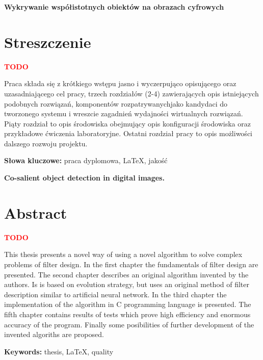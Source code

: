 \newpage
\begin{center}
\large \bf
Wykrywanie współistotnych obiektów na obrazach cyfrowych
\end{center}

\section*{Streszczenie}
\textcolor{red}{\textbf{TODO}}

Praca składa się z krótkiego wstępu jasno i
wyczerpująco opisującego oraz uzasadniającego cel pracy, trzech rozdziałów (2-4)
zawierających opis istniejących podobnych
rozwiązań, komponentów rozpatrywanychjako kandydaci do
tworzonego systemu i wreszcie zagadnień wydajności wirtualnych
rozwiązań. Piąty rozdział to opis  środowiska obejmujący opis konfiguracji
środowiska oraz przykładowe ćwiczenia laboratoryjne. Ostatni
rozdział pracy to opis możliwości dalszego
rozwoju projektu. 

\bigskip
{\noindent\bf Słowa kluczowe:} praca dyplomowa, LaTeX, jakość

\vskip 2cm


\begin{center}
\large \bf
Co-salient object detection in digital images.
\end{center}

\section*{Abstract}
\textcolor{red}{\textbf{TODO}}

This thesis presents a novel way of using a novel algorithm to solve complex
problems of filter design. In the first chapter the fundamentals of filter design
are presented. The second chapter describes an original algorithm invented by the
authors. Is is based on evolution strategy, but uses an original method of filter
description similar to artificial neural network. In the third chapter the implementation
of the algorithm in C programming language is presented. The fifth chapter contains results
of tests which prove high efficiency and enormous accuracy of the program. Finally some
posibilities of further development of the invented algoriths are proposed.

\bigskip
{\noindent\bf Keywords:} thesis, LaTeX, quality

\vfill